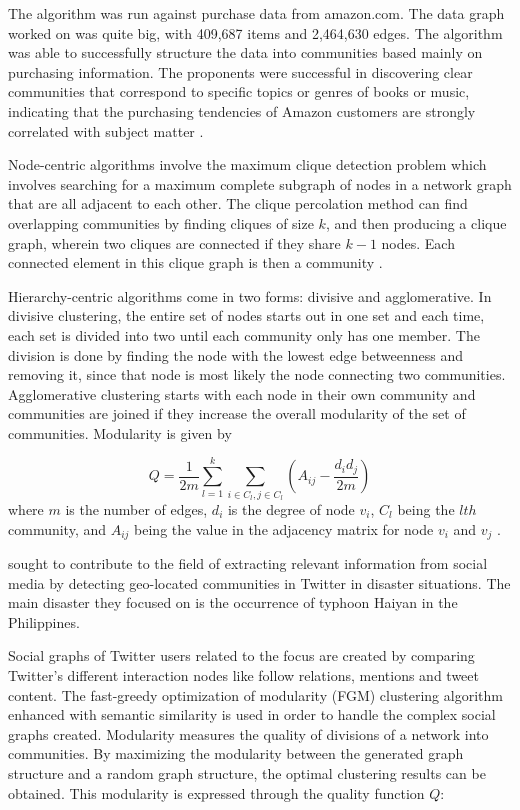 The algorithm was run against purchase data from amazon.com. The data graph worked on was quite big, with 409,687 items and 2,464,630 edges. The algorithm was able to successfully structure the data into communities based mainly on purchasing information. The proponents were successful in discovering clear communities that correspond to specific topics or genres of books or music, indicating that the purchasing tendencies of Amazon customers are strongly correlated with subject matter \cite{Clauset:2004}.


Node-centric algorithms involve the maximum clique detection problem which involves searching for a maximum complete subgraph of nodes in a network graph that are all adjacent to each other. The clique percolation method can find overlapping communities by finding cliques of size $k$, and then producing a clique graph, wherein two cliques are connected if they share $k-1$ nodes. Each connected element in this clique graph is then a community \cite{Tang:2010}.


Hierarchy-centric algorithms come in two forms: divisive and agglomerative. In divisive clustering, the entire set of nodes starts out in one set and each time, each set is divided into two until each community only has one member. The division is done by finding the node with the lowest edge betweenness and removing it, since that node is most likely the node connecting two communities. Agglomerative clustering starts with each node in their own community and communities are joined if they increase the overall modularity of the set of communities. Modularity is given by


\begin{equation}
	Q = \frac{1}{2m} \sum_{l = 1}^{k} \sum_{i \in C_l, j \in C_l} (A_{ij} - \frac{d_i d_j}{2m})
\end{equation}where $m$ is the number of edges, $d_i$ is the degree of node $v_i$, $C_l$ being the $lth$ community, and $A_{ij}$ being the value in the adjacency matrix for node $v_i$ and $v_j$ \cite{Tang:2010} .


 sought to contribute to the field of extracting relevant information from social media by detecting geo-located communities in Twitter in disaster situations. The main disaster they focused on is the occurrence of typhoon Haiyan in the Philippines. 


Social graphs of Twitter users related to the focus are created by comparing Twitter's different interaction nodes like follow relations, mentions and tweet content. The fast-greedy optimization of modularity (FGM) clustering algorithm enhanced with semantic similarity is used in order to handle the complex social graphs created. Modularity measures the quality of divisions of a network into communities. By maximizing the modularity between the generated graph structure and a random graph structure, the optimal clustering results can be obtained. This modularity is expressed through the quality function $Q$:


